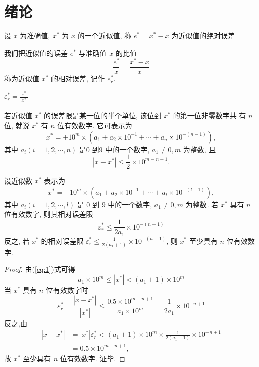 \section{绪论}

\begin{definition}[绝对误差]
设 $x$ 为准确值, $x^{*}$ 为 $x$ 的一个近似值, 称 $e^{*}=x^{*}-x$ 为近似值的绝对误差
\end{definition}

\begin{definition}[相对误差]
我们把近似值的误差 $e^{*}$ 与准确值 $x$ 的比值
$$
\frac{e^{*}}{x}=\frac{x^{*}-x}{x}
$$
称为近似值 $x^{*}$ 的相对误差, 记作 $e_{r}^{*}$.
\end{definition}

\begin{definition}[相对误差限]
  $\varepsilon_{r}^{*}=\frac{\varepsilon^{*}}{\left|x^{*}\right|}$
\end{definition}

\begin{definition}[有效数字]
若近似值 $x^{*}$ 的误差限是某一位的半个单位, 该位到 $x^{*}$ 的第一位非零数字共 有 $n$ 位, 就说 $x^{*}$ 有 $n$ 位有效数字. 它可表示为
\begin{equation}
x^{*}=\pm 10^{m} \times\left(a_{1}+a_{2} \times 10^{-1}+\cdots+a_{n} \times 10^{-(n-1)}\right),
\end{equation}
其中 $a_{i}(i=1,2, \cdots, n)$ 是0 到9 中的一个数字, $a_{1} \neq 0, m$ 为整数, 且
\begin{equation}
\left|x-x ^{*}\right| \leq \frac{1}{2} \times 10^{m-n+1} .
\end{equation}
\end{definition}

\begin{theorem}
设近似数 $x^{*}$ 表示为
\begin{equation}
x^{*}=\pm 10^{m} \times\left(a_{1}+a_{2} \times 10^{-1}+\cdots+a_{l} \times 10^{-(l-1)}\right),
  \label{eq:1}
\end{equation}
其中 $a_{i}(i=1,2, \cdots, l)$ 是 0 到 9 中的一个数字, $a_{1} \neq 0, m$ 为整数. 若 $x^{*}$ 具有 $n$ 位有效数字, 则其相对误差限
$$
\varepsilon_{r}^{*} \leq \frac{1}{2 a_{1}} \times 10^{-(n-1)}
$$
反之, 若 $x^{*}$ 的相对误差限 $\varepsilon_{r}^{*} \leq \frac{1}{2\left(a_{1}+1\right)} \times 10^{-(n-1)}$, 则 $x^{*}$ 至少具有 $n$ 位有效数字.
\end{theorem}

\begin{proof}
由(\ref{eq:1})式可得
$$
a_{1} \times 10^{m} \leq \left|x^{*}\right|<\left(a_{1}+1\right) \times 10^{m}
$$
当 $x^{*}$ 具有 $n$ 位有效数字时
$$
\varepsilon_{r}^{*}=\frac{\left|x-x^{*}\right|}{\left|x^{*}\right|} \leq \frac{0.5 \times 10^{m-n+1}}{a_{1} \times 10^{m}}=\frac{1}{2 a_{1}} \times 10^{-n+1}
$$
反之,由
$$
\begin{aligned}
\left|x-x^{*}\right| &=\left|x^{*}\right| \varepsilon_{r}^{*}<\left(a_{1}+1\right) \times 10^{m} \times \frac{1}{2\left(a_{1}+1\right)} \times 10^{-n+1} \\
&=0.5 \times 10^{m-n+1},
\end{aligned}
$$
故 $x^{*}$ 至少具有 $n$ 位有效数字. 证毕. 
\end{proof}

